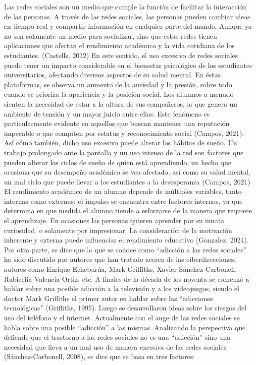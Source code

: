 \documentclass[oneside,11pt]{Latex/Classes/PhDthesisPSnPDF}
\begin{document}
Las redes sociales son un medio que cumple la función de facilitar la
interacción de las personas. A través de las redes sociales, las
personas pueden cambiar ideas en tiempo real y compartir información en
cualquier parte del mundo. Aunque ya no son solamente un medio para
socializar, sino que estas redes tienen aplicaciones que afectan el
rendimiento académico y la vida cotidiana de los estudiantes. (Castells,
2012) En este sentido, el uso excesivo de redes sociales puede tener un
impacto considerable en el bienestar psicológico de los estudiantes
universitarios, afectando diversos aspectos de su salud mental. En éstas
plataformas, se observa un aumento de la ansiedad y la presión, sobre
todo cuando se prioriza la apariencia y la posición social. Los alumnos
a menudo sienten la necesidad de estar a la altura de sus compañeros, lo
que genera un ambiente de tensión y un mayor juicio entre ellos. Este
fenómeno es particularmente evidente en aquellos que buscan mantener una
reputación impecable o que compiten por estatus y reconocimiento social
(Campos, 2021). Así cómo también, dicho uso excesivo puede alterar los
hábitos de sueño. Un trabajo prolongado ante la pantalla y un uso
intenso de la red son factores que pueden alterar los ciclos de sueño de
quien está aprendiendo, un hecho que ocasiona que su desempeño académico
se vea afectado, así como su salud mental, un mal ciclo que puede llevar
a los estudiantes a la desesperanza (Campos, 2021) El rendimiento
académico de un alumno depende de múltiples variables, tanto internas
como externas; el impulso se encuentra entre factores internos, ya que
determina en que medida el alumno tiende a esforzarse de la manera que
requiere el aprendizaje. En ocasiones las personas quieren aprender por
su innata curiosidad, o solamente por impresionar. La consideración de
la motivación inherente y externa puede influenciar el rendimiento
educativo (Gonzalez, 2024). Por otra parte, se dice que lo que se conoce
como ``adicción a las redes sociales'' ha sido discutido por autores que
han tratado acerca de las ciberdirecciones, autores como Enrique
Echeburúa, Mark Griffiths, Xavier Sánchez-Carbonell, Rubicelia Valencia
Ortiz, etc. A finales de la década de los noventa se comenzó a hablar
sobre una posible adicción a la televisión y a los videojuegos, siendo
el doctor Mark Griffiths el primer autor en hablar sobre las
``adicciones tecnológicas'' (Griffiths, 1995). Luego se desarrollaron
ideas sobre los riesgos del uso del teléfono y el internet. Actualmente
con el auge de las redes sociales se habla sobre una posible
``adicción'' a las mismas. Analizando la perspectiva que defiende que el
trastorno a las redes sociales no es una ``adicción'' sino una necesidad
que lleva a un mal uso de manera excesiva de las redes sociales
(Sánchez-Carbonell, 2008), se dice que se basa en tres factores:
\end{document}
